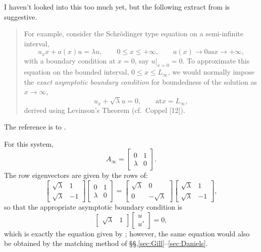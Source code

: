 \documentclass{article}
\begin{document}
I haven't looked into this too much yet, but the following extract
from \citet[at pp.~200--201]{Allen02:NM-92-197} is suggestive.
\begin{quotation}
For example, consider the Schr\"odinger type equation on a semi-infinite interval, 
\begin{displaymath}
u_xx + a(x) u = \lambda u, 
\qquad 0\leq x\leq +\infty, 
\qquad a(x)\rightarrow 0 \mathrm{as} x\rightarrow +\infty,
\end{displaymath}
with a boundary condition at $x=0$, say $u|_{x=0}=0$.  To approximate
this equation  on the bounded interval, $0\leq x\leq L_\infty$, we
would normally impose the \textit{exact asymptotic boundary condition}
for boundedness of the solution as $x\rightarrow\infty$,
\begin{displaymath}
u_x + \sqrt{\lambda} u = 0,
\qquad \mathrm{at} x=L_\infty,
\end{displaymath}
derived using Levinson's Theorem (cf.\ Coppel [12]).
\end{quotation}
The reference is to \citet{Coppel65:SAB}.

For this system,
\begin{equation}
A_\infty = \left[ \begin{array}{cc}
        0 & 1 \\
        \lambda & 0 
        \end{array}
        \right].
\end{equation}
The row eigenvectors are given by the rows of:
\begin{equation}
\left[ \begin{array}{cc}
        \sqrt{\lambda} & 1 \\
        \sqrt{\lambda} & -1 
        \end{array}
        \right]
\left[ \begin{array}{cc}
        0 & 1 \\
        \lambda & 0 
        \end{array}
        \right]
=
\left[ \begin{array}{cc}
        \sqrt{\lambda} & 0 \\
        0 & -\sqrt{\lambda}
        \end{array}
        \right]
\left[ \begin{array}{cc}
        \sqrt{\lambda} & 1 \\
        \sqrt{\lambda} & -1 
        \end{array}
        \right],
\end{equation}
so that the appropriate asymptotic boundary condition is
\begin{equation}
\left[\begin{array}{cc} \sqrt{\lambda} & 1\end{array}\right]
\left[\begin{array}{c} u \\ u' \end{array}\right] = 0,
\end{equation}
which is exactly the equation given by \citet{Allen02:NM-92-197};
however, the same equation would also be obtained by the matching
method of \S\S,\ref{sec:Gill}--\ref{sec:Daniels}.
\end{document}
